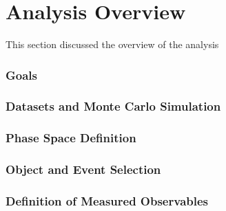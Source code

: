 \part {\LARGE{Analysis Overview}}
\label{sec:AnalysisOverview}
This section discussed the overview of the analysis

\section{Goals}
\label{sec:Analysis_Goals}


\section{Datasets and Monte Carlo Simulation}
\label{sec:DataSetAndMonteCarlo}


\section{Phase Space Definition}
\label{sec:FidSel}


\section{Object and Event Selection}
\label{sec:ObjectEventSel}


\section{Definition of Measured Observables}
\label{sec:Obs}
